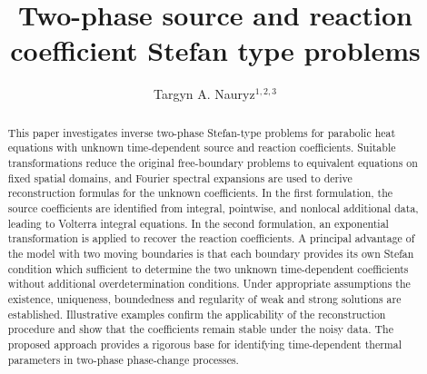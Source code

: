 \documentclass[preprint,12pt,authoryear]{elsarticle}
\begin{document}
\begin{frontmatter}

\title{Two-phase source and reaction coefficient Stefan type problems} 


\author{Targyn A. Nauryz$^{1,2,3}$}

\address{$^1$International School of Economics, Kazakh-British Technical University, Almaty, Kazakhstan,\\
$^2$Institute of Mathematics and Mathematical Modeling, Almaty, Kazakhstan,\\
$^3$School of Digital Technologies, Narxoz University, Almaty, Kazakhstan\\
Email: targyn.nauryz@gmail.com}

\begin{abstract}
This paper investigates inverse two-phase Stefan-type problems for parabolic heat equations with unknown time-dependent source and reaction coefficients. Suitable transformations reduce the original free-boundary problems to equivalent equations on fixed spatial domains, and Fourier spectral expansions are used to derive reconstruction formulas for the unknown coefficients. In the first formulation, the source coefficients are identified from integral, pointwise, and nonlocal additional data, leading to Volterra integral equations. In the second formulation, an exponential transformation is applied to recover the reaction coefficients. A principal advantage of the model with two moving boundaries is that each boundary provides its own Stefan condition which sufficient to determine the two unknown time-dependent coefficients without additional overdetermination conditions. Under appropriate assumptions the existence, uniqueness, boundedness and regularity of weak and strong solutions are established. Illustrative examples confirm the applicability of the reconstruction procedure and show that the coefficients remain stable under the noisy data. The proposed approach provides a rigorous base for identifying time-dependent thermal parameters in two-phase phase-change processes.
\end{abstract}





\end{frontmatter}
\end{document}
